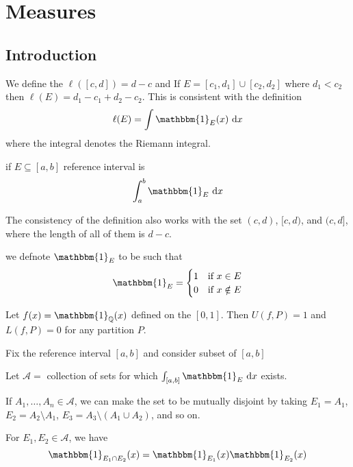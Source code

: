 \chapter{Measures}
\section{Introduction}

We define the $\ell([c, d]) = d-c$ and If $E = [c_1, d_1] \cup[c_2, d_2]$ 
where $d_1 < c_2$ then $\ell(E) = d_1 - c_1 + d_2 - c_2$.
This is consistent with the definition
\[\ell(E) = \int \mathbbm{1}_E(x) \ \mathrm{d}x\]
where the integral denotes the Riemann integral.

if $E \subseteq[a, b]$ reference interval is 
\[\int_a^b \mathbbm{1}_E\ \mathrm{d}x\]

\begin{remark}
  The consistency of the definition also works with the set $(c, d)$, $[c, d)$, and $(c, d]$, 
  where the length of all of them is $d-c$.
\end{remark}

\begin{remark}
  we defnote $\mathbbm{1}_E$ to be such that
  \[
    \mathbbm{1}_E = 
  \begin{cases}
    1 & \text{if } x \in E\\
    0 & \text{if } x \notin E 
  \end{cases}
  \]
\end{remark}

\begin{example}
  Let $f(x) = \mathbbm{1}_{\QQ}(x)$ defined on the $[0, 1]$. 
  Then $U(f, P) = 1$ and $L(f, P) = 0$ for any partition $P$. 
\end{example}



Fix the reference interval $[a, b]$ and consider subset of $[a, b]$

Let $\mathcal{A}=$ collection of sets for which $\int_{[a, b]} \mathbbm{1}_E\ \mathrm{d}x$ exists.

If $A_1, \dotsc, A_n \in \mathcal{A}$, we can make the set to be mutually disjoint by taking 
$E_1 = A_1$, $E_2 = A_2 \setminus A_1$, $E_3 = A_3 \setminus (A_1 \cup A_2)$, and so on.

\begin{example}
  For $E_1, E_2 \in \mathcal{A}$, we have
  \[\mathbbm{1}_{E_1 \cap E_2}(x) = \mathbbm{1}_{E_1}(x)\mathbbm{1}_{E_2}(x)\]
\end{example}

